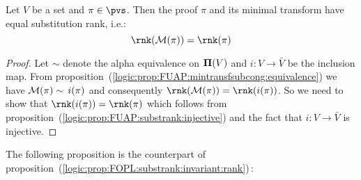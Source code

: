 \begin{prop}\label{logic:prop:FUAP:substrank:minrank}
Let $V$ be a set and $\pi\in\pvs$. Then the proof $\pi$ and its
minimal transform have equal substitution rank, i.e.:
    \[
    \rnk({\cal M}(\pi))=\rnk(\pi)
    \]
\end{prop}
\begin{proof}
Let $\sim$ denote the alpha equivalence on ${\bf\Pi}(V)$ and
$i:V\to\bar{V}$ be the inclusion map. From
proposition~(\ref{logic:prop:FUAP:mintransfsubcong:equivalence}) we
have ${\cal M}(\pi)\sim\, i(\pi)$ and consequently $\rnk({\cal
M}(\pi))=\rnk(i(\pi))$. So we need to show that
$\rnk(i(\pi))=\rnk(\pi)$ which follows from
proposition~(\ref{logic:prop:FUAP:substrank:injective}) and the fact
that $i:V\to\bar{V}$ is injective.
\end{proof}

The following proposition is the counterpart of
proposition~(\ref{logic:prop:FOPL:substrank:invariant:rank})\,:

